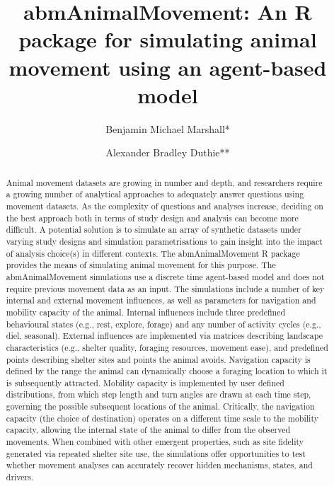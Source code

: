 \documentclass[10pt,a4paper]{article}
\begin{document}
\pagestyle{fancy}

\title{abmAnimalMovement: An R package for simulating animal movement using an agent-based model}
\author[1]{Benjamin Michael Marshall*}
\author[1]{Alexander Bradley Duthie**}


\maketitle
\thispagestyle{fancy}

\begin{abstract}

Animal movement datasets are growing in number and depth, and researchers require a growing number of analytical approaches to adequately answer questions using movement datasets. As the complexity of questions and analyses increase, deciding on the best approach both in terms of study design and analysis can become more difficult. A potential solution is to simulate an array of synthetic datasets under varying study designs and simulation parametrisations to gain insight into the impact of analysis choice(s) in different contexts. The abmAnimalMovement R package provides the means of simulating animal movement for this purpose. The abmAnimalMovement simulations use a discrete time agent-based model and does not require previous movement data as an input. The simulations include a number of key internal and external movement influences, as well as parameters for navigation and mobility capacity of the animal. Internal influences include three predefined behavioural states (e.g., rest, explore, forage) and any number of activity cycles (e.g., diel, seasonal). External influences are implemented via matrices describing landscape characteristics (e.g., shelter quality, foraging resources, movement ease), and predefined points describing shelter sites and points the animal avoids. Navigation capacity is defined by the range the animal can dynamically choose a foraging location to which it is subsequently attracted. Mobility capacity is implemented by user defined distributions, from which step length and turn angles are drawn at each time step, governing the possible subsequent locations of the animal. Critically, the navigation capacity (the choice of destination) operates on a different time scale to the mobility capacity, allowing the internal state of the animal to differ from the observed movements. When combined with other emergent properties, such as site fidelity generated via repeated shelter site use, the simulations offer opportunities to test whether movement analyses can accurately recover hidden mechanisms, states, and drivers.

\end{abstract}
\end{document}
